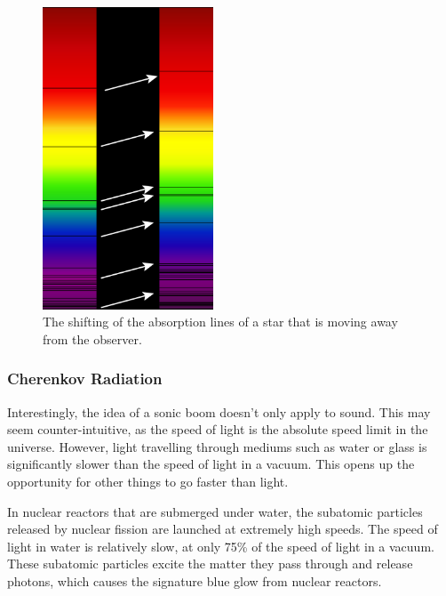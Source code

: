\documentclass[12pt]{article}
\begin{document}
\begin{figure}[H]
	\centering
	\includegraphics[width=2in]{redshift}
	\caption{The shifting of the absorption lines of a star that is moving away from the observer.}
	\label{fig:redshift}
\end{figure}

\subsubsection{Cherenkov Radiation}

Interestingly, the idea of a sonic boom doesn't only apply to sound. This may seem counter-intuitive, as the speed of light is the absolute speed limit in the universe. However, light travelling through mediums such as water or glass is significantly slower than the speed of light in a vacuum. This opens up the opportunity for other things to go faster than light.

In nuclear reactors that are submerged under water, the subatomic particles released by nuclear fission are launched at extremely high speeds. The speed of light in water is relatively slow, at only 75\% of the speed of light in a vacuum. These subatomic particles excite the matter they pass through and release photons, which causes the signature blue glow from nuclear reactors.
\end{document}
